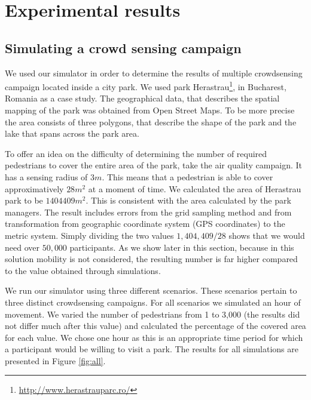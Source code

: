 \chapter{Experimental results}
\label{chapter:res}


\section{Simulating a crowd sensing campaign}
\label{sec:res-crowd}

We used our simulator in order to determine the results of multiple crowdsensing campaign located inside a city park. We used park Herastrau\footnote{\url{http://www.herastrauparc.ro/}}, in Bucharest, Romania as a case study. The geographical data, that describes the spatial mapping of the park was obtained from Open Street Maps. To be more precise the area consists of three polygons, that describe the shape of the park and the lake that spans across the park area.

To offer an idea on the difficulty of determining the number of required pedestrians to cover the entire area of the park, take the air quality campaign. It has a sensing radius of $3m$. This means that a pedestrian is able to cover approximatively $28m^2$ at a moment of time. We calculated the area of Herastrau park to be $1404409m^2$. This is consistent with the area calculated by the park managers. The result includes errors from the grid sampling method and from transformation from geographic coordinate system (GPS coordinates) to the metric system. Simply dividing the two values $1,404,409/28$ shows that we would need over $50,000$ participants. As we show later in this section, because in this solution mobility is not considered, the resulting number is far higher compared to the value obtained through simulations. 

We run our simulator using three different scenarios. These scenarios pertain to three distinct crowdsensing campaigns. For all scenarios we simulated an hour of movement. We varied the number of pedestrians from 1 to 3,000 (the results did not differ much after this value) and calculated the percentage of the covered area for each value. We chose one hour as this is an appropriate time period for which a participant would be willing to visit a park. The results for all simulations are presented in Figure \ref{fig:all}.

